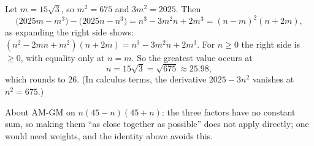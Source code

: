 Let $m=15\sqrt3$, so $m^2=675$ and $3m^2=2025$. Then
\[
\bigl(2025m-m^3\bigr)-\bigl(2025n-n^3\bigr)=n^3-3m^2n+2m^3=(n-m)^2(n+2m),
\]
as expanding the right side shows: $(n^2-2mn+m^2)(n+2m)=n^3-3m^2n+2m^3$. For $n\ge0$ the right side is $\ge0$, with equality only at $n=m$. So the greatest value occurs at
\[
n=15\sqrt3=\sqrt{675}\approx25.98,
\]
which rounds to $\boxed{26}$. (In calculus terms, the derivative $2025-3n^2$ vanishes at $n^2=675$.)

About AM-GM on $n(45-n)(45+n)$: the three factors have no constant sum, so making them ``as close together as possible'' does not apply directly; one would need weights, and the identity above avoids this.
